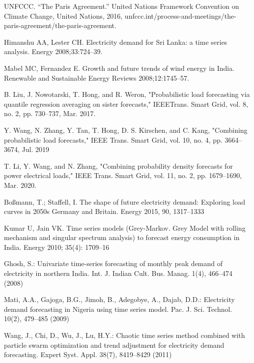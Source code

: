 \documentclass[lettersize,journal]{IEEEtran}
\begin{document}
\begin{thebibliography}{1}
  
  UNFCCC. “The Paris Agreement.” United Nations Framework Convention on Climate Change, United Nations, 2016, unfccc.int/process-and-meetings/the-paris-agreement/the-paris-agreement.
  
  Himanshu AA, Lester CH. Electricity demand for Sri Lanka: a time series analysis. Energy 2008;33:724–39.

  Mabel MC, Fernandez E. Growth and future trends of wind energy in India. Renewable and Sustainable Energy Reviews 2008;12:1745–57.

  B. Liu, J. Nowotarski, T. Hong, and R. Weron, "Probabilistic load forecasting via quantile regression averaging on sister forecasts," IEEETrans. Smart Grid, vol. 8, no. 2, pp. 730–737, Mar. 2017.

  Y. Wang, N. Zhang, Y. Tan, T. Hong, D. S. Kirschen, and C. Kang, "Combining probabilistic load forecasts," IEEE Trans. Smart Grid, vol. 10, no. 4, pp. 3664–3674, Jul. 2019

  T. Li, Y. Wang, and N. Zhang, "Combining probability density forecasts for power electrical loads," IEEE Trans. Smart Grid, vol. 11, no. 2, pp. 1679–1690, Mar. 2020.

  Boßmann, T.; Staffell, I. The shape of future electricity demand: Exploring load curves in 2050s Germany and Britain. Energy 2015, 90, 1317–1333


  Kumar U, Jain VK. Time series models (Grey-Markov. Grey Model with rolling mechanism and singular spectrum analysis) to forecast energy consumption in India. Energy 2010; 35(4): 1709–16

  Ghosh, S.: Univariate time-series forecasting of monthly peak demand of electricity in northern India. Int. J. Indian Cult. Bus. Manag. 1(4), 466–474 (2008)

  Mati, A.A., Gajoga, B.G., Jimoh, B., Adegobye, A., Dajab, D.D.: Electricity demand forecasting in Nigeria using time series model. Pac. J. Sci. Technol. 10(2), 479–485 (2009)

  Wang, J., Chi, D., Wu, J., Lu, H.Y.: Chaotic time series method combined with particle swarm optimization and trend adjustment for electricity demand forecasting. Expert Syst. Appl. 38(7), 8419–8429 (2011)


\end{thebibliography}
\end{document}
